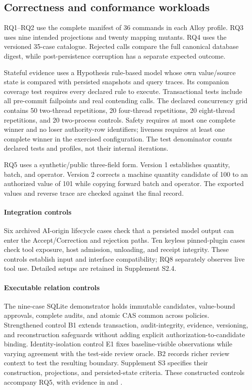\subsection{Correctness and conformance workloads}

RQ1--RQ2 use the complete manifest of 36 commands in each Alloy profile. RQ3 uses nine intended projections and twenty mapping mutants. RQ4 uses the versioned 35-case catalogue. Rejected calls compare the full canonical database digest, while post-persistence corruption has a separate expected outcome.

Stateful evidence uses a Hypothesis rule-based model whose own value/source state is compared with persisted snapshots and query traces. Its companion coverage test requires every declared rule to execute. Transactional tests include all pre-commit failpoints and real contending calls. The declared concurrency grid contains 50 two-thread repetitions, 20 four-thread repetitions, 20 eight-thread repetitions, and 20 two-process controls. Safety requires at most one complete winner and no loser authority-row identifiers; liveness requires at least one complete winner in the exercised configuration. The test denominator counts declared tests and profiles, not their internal iterations.

RQ5 uses a synthetic/public three-field form. Version 1 establishes quantity, batch, and operator. Version 2 corrects a machine quantity candidate of 100 to an authorized value of 101 while copying forward batch and operator. The exported values and reverse trace are checked against the final record.

\paragraph{Integration controls}
Six archived AI-origin lifecycle cases check that a persisted model output can enter the Accept/Correction and rejection paths. Ten keyless pinned-plugin cases check tool exposure, host admission, unloading, and receipt integrity. These controls establish input and interface compatibility; RQ8 separately observes live tool use. Detailed setups are retained in Supplement S2.4.

\paragraph{Executable relation controls}
The nine-case SQLite demonstrator holds immutable candidates, value-bound approvals, complete audits, and atomic CAS common across policies. Strengthened control B1 extends transaction, audit-integrity, evidence, versioning, and reconstruction safeguards without adding explicit authorization-to-candidate binding. Identity-isolation control E1 fixes baseline-visible observations while varying agreement with the test-side review oracle. B2 records richer review context to test the resulting boundary. Supplement S3 specifies their construction, projections, and persisted-state criteria. These constructed controls accompany RQ5, with evidence in  and .

